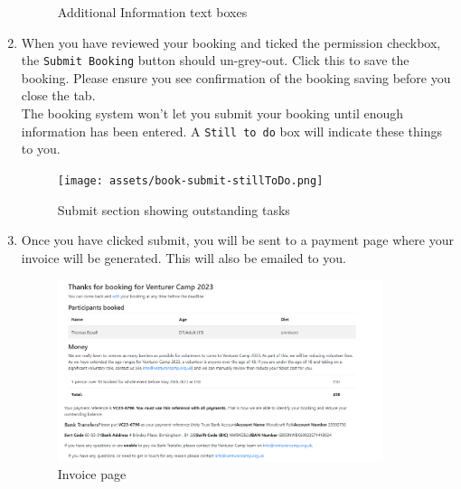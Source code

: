 \begin{enumerate}
\begin{figure}[H]
        \caption{Additional Information text boxes}
    \end{figure}
    \item When you have reviewed your booking and ticked the permission checkbox, the \verb|Submit Booking| button should un-grey-out. Click this to save the booking. Please ensure you see confirmation of the booking saving before you close the tab.\\
    The booking system won't let you submit your booking until enough information has been entered. A \verb|Still to do| box will indicate these things to you.
    \begin{figure}[H]
        \centering
        \texttt{[image: assets/book-submit-stillToDo.png]}
        \caption{Submit section showing outstanding tasks}
    \end{figure}
    \item Once you have clicked submit, you will be sent to a payment page where your invoice will be generated. This will also be emailed to you.
    \begin{figure}[H]
        \centering
        \includegraphics[width=0.9\textwidth]{assets/book-confirmation.png}
        \caption{Invoice page}
    \end{figure}
\end{enumerate}